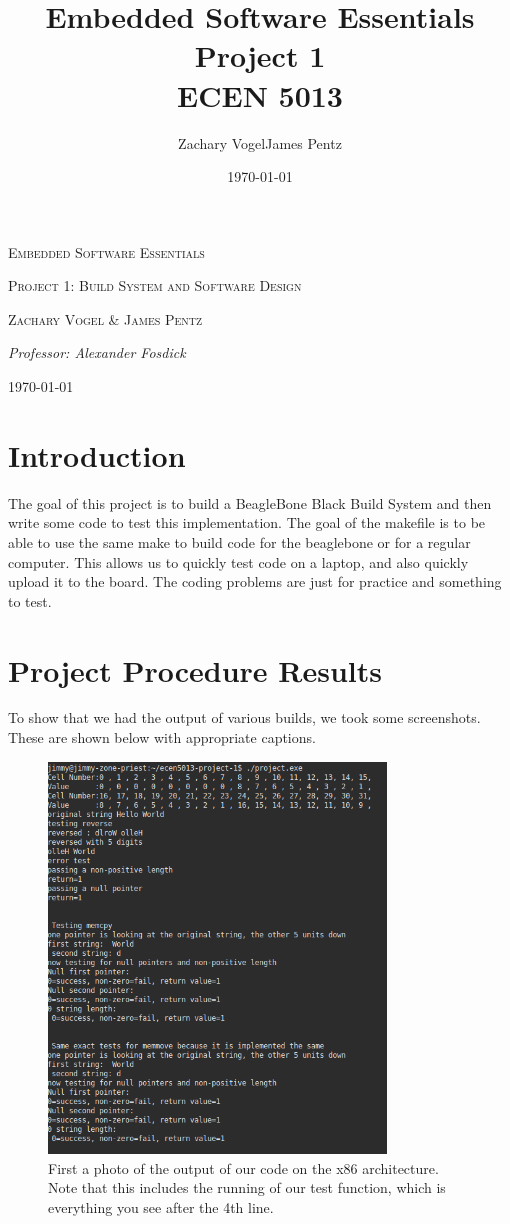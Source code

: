 \documentclass{article}
\author{Zachary Vogel\quad James Pentz}
\title{Embedded Software Essentials Project 1\\ ECEN 5013}
\date{\today}
\begin{document}
\begin{titlepage}
    \centering
    \vspace*{2cm}
    {\scshape\Huge Embedded Software Essentials \par}
    \vspace{2cm}
    {\scshape\Large Project 1: Build System and Software Design \par}
    \vspace{2.5cm}
    {\Large \scshape Zachary Vogel \& James Pentz\par}
    \vspace{1cm}
    {\large \itshape Professor: Alexander Fosdick}
    \vfill
    {\large \today\par}
\end{titlepage}

\section*{Introduction}
The goal of this project is to build a BeagleBone Black Build System and then write some code to test this implementation. The goal of the makefile is to be able to use the same make to build code for the beaglebone or for a regular computer. This allows us to quickly test code on a laptop, and also quickly upload it to the board. The coding problems are just for practice and something to test.


\section*{Project Procedure Results}
To show that we had the output of various builds, we took some screenshots. These are shown below with appropriate captions.
\begin{figure}[H]
    \centering
    \includegraphics[width=0.8\textwidth]{x86_exe_pic1.png}
    \caption{First a photo of the output of our code on the x86 architecture. Note that this includes the running of our test function, which is everything you see after the 4th line.}
\end{figure}
\end{document}
